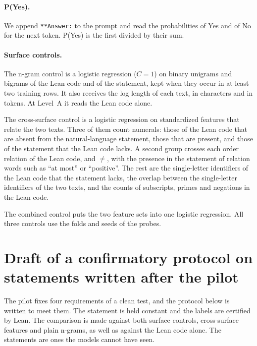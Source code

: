 \documentclass[10pt]{article}
\newcommand{\vr}[1]{\texttt{#1}}
\begin{document}
\paragraph{P(Yes).} We append \vr{**Answer:} to the prompt and read the probabilities of Yes and of No for the next
token. P(Yes) is the first divided by their sum.

\paragraph{Surface controls.} The n-gram control is a logistic regression ($C = 1$) on binary unigrams and bigrams of
the Lean code and of the statement, kept when they occur in at least two training rows. It also receives the log length of
each text, in characters and in tokens. At Level~A it reads the Lean code alone.

The cross-surface control is a logistic regression on standardized features that relate the two texts. Three of them
count numerals: those of the Lean code that are absent from the natural-language statement, those that are
present, and those of the statement that the Lean code lacks. A second group crosses each order relation of the Lean code, and
$\neq$, with the presence in the statement of relation words such as ``at most'' or ``positive''. The rest are the
single-letter identifiers of the Lean code that the statement lacks, the overlap between the single-letter identifiers of
the two texts, and the counts of subscripts, primes and negations in the Lean code.

The combined control puts the two feature sets into one logistic regression. All three controls use the folds and
seeds of the probes.

\section{Draft of a confirmatory protocol on statements written after the pilot}\label{app:protocolo}

The pilot fixes four requirements of a clean test, and the protocol below is written to meet them. The statement is
held constant and the labels are certified by Lean. The comparison is made against both surface controls,
cross-surface features and plain n-grams, as well as against the Lean code alone. The statements are ones the models cannot
have seen.
\end{document}
